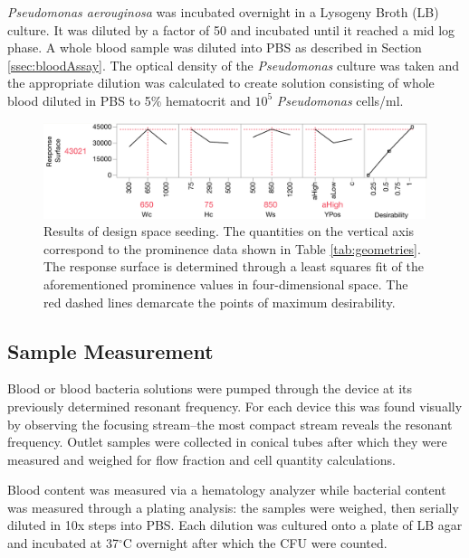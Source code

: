 \textit{Pseudomonas aerouginosa}  was incubated overnight in a Lysogeny Broth (LB) culture. It was diluted by a factor of 50 and incubated until it reached a mid log phase. A whole blood sample was diluted into PBS as described in Section \ref{ssec:bloodAssay}. The optical density of the \textit{Pseudomonas} culture was taken and the appropriate dilution was calculated to create solution consisting of whole blood diluted in PBS to 5\% hematocrit and $10^5$ \textit{Pseudomonas} cells/ml. 

\begin{figure}[htb]
  \begin{minipage}[t]{0.99\linewidth}\centering
    \includegraphics[width=14cm]{L9}
  \end{minipage}\hfill
  \caption[Results of initial seeding of design space]{Results of design space seeding. The quantities on the vertical axis correspond to the prominence data shown in Table \ref{tab:geometries}. The response surface is determined through a least squares fit of the aforementioned prominence values in four-dimensional space. The red dashed lines demarcate the points of maximum desirability.}
	\label{fig:L9}
\end{figure}

\subsection{Sample Measurement}
\label{sec:sampleMeasurement}

Blood or blood bacteria solutions were pumped through the device at its previously determined resonant frequency.  For each device this was found visually by observing the focusing stream--the most compact stream reveals the resonant frequency.  Outlet samples were collected in conical tubes after which they were measured and weighed for flow fraction and cell quantity calculations. 

Blood content was measured via a hematology analyzer while bacterial content was measured through a plating analysis: the samples were weighed, then serially diluted in 10x steps into PBS. Each dilution was cultured onto a plate of LB agar and incubated at 37$^{\circ}$C overnight after which the CFU were counted.   

